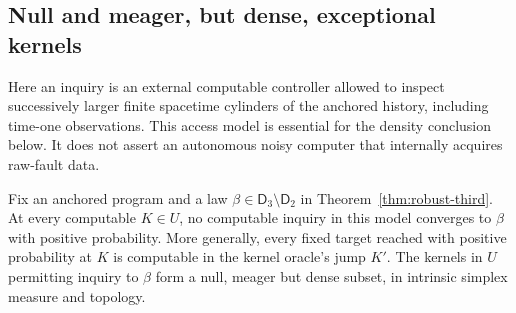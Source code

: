 \subsection{Null and meager, but dense, exceptional kernels}
\label{subsec:exceptional-kernels}
Here an inquiry is an external computable controller allowed to
inspect successively larger finite spacetime cylinders of the
anchored history, including time-one observations. This access model
is essential for the density conclusion below. It does not assert an
autonomous noisy computer that internally acquires raw-fault data.

\begin{theorem}
\label{thm:exceptional-kernels}
Fix an anchored program and a law
$\beta\in\mathsf D_3\setminus\mathsf D_2$ in
Theorem~\ref{thm:robust-third}. At every computable $K\in U$, no
computable inquiry in this model converges to $\beta$ with positive
probability. More generally, every fixed target reached with positive
probability at $K$ is computable in the kernel oracle's jump $K'$.
The kernels in $U$ permitting inquiry to $\beta$ form a null, meager
but dense subset, in intrinsic simplex measure and topology.
\end{theorem}
